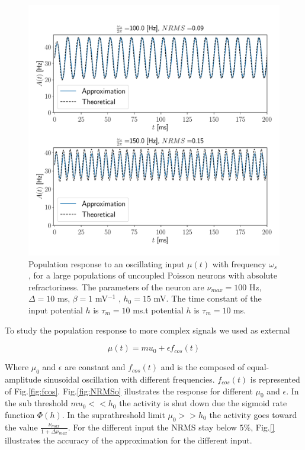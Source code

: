 \documentclass[12pt,twoside]{report}
\begin{document}
\begin{figure}[h!]
	\centering
	\includegraphics[width=0.8\linewidth]{A_omega_t.pdf}
	\caption{Population response to an oscillating input $\mu(t)$ with frequency $\omega_s$, for a large populations of uncoupled Poisson neurons with absolute refractoriness. The parameters of the neuron are $\nu_{max}=100$ Hz, $\Delta=10$ ms, $\beta=1$ mV$^{-1}$ , $h_0=15$ mV. The time constant of the input potential $h$ is $\tau_m=10$ ms.t potential $h$ is $\tau_m=10$ ms.
	}
	\label{fig:A_omega_t}
\end{figure}

To study the population response to more complex signals we used as external

\begin{equation}
\label{eq:mu2}
\mu(t)=mu_0+\epsilon f_{cos}(t)
\end{equation} 


Where $\mu_0$ and $\epsilon$ are constant and $f_{cos}(t)$ and is the composed of equal-amplitude sinusoidal oscillation with different frequencies. $f_{cos}(t)$ is represented of Fig.\ref{fig:fcos}. Fig.\ref{fig:NRMSo} illustrates the response for different $\mu_0$ and $\epsilon$. In the sub threshold $mu_0<<h_0$ the activity is shut down due the sigmoid rate function $\Phi(h)$. In the suprathreshold limit $\mu_0>>h_0$ the activity goes toward the value $\frac{\nu_{max}}{1+\Delta\nu_{max}}$. For the different input the NRMS stay below $5\%$, Fig.\ref{} illustrates the accuracy of the approximation for the different input. 
\end{document}
